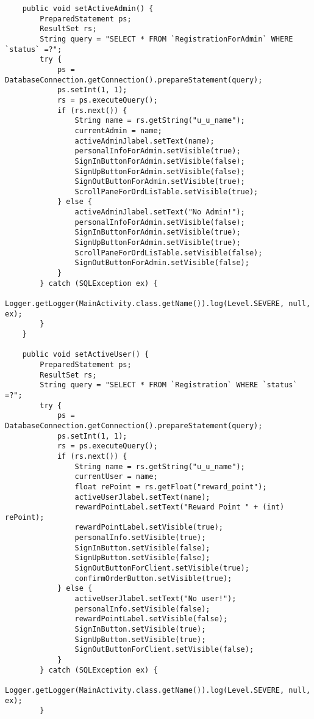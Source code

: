 \documentclass[12pt,a4paper]{article}
\begin{document}
\begin{lstlisting}
    public void setActiveAdmin() {
        PreparedStatement ps;
        ResultSet rs;
        String query = "SELECT * FROM `RegistrationForAdmin` WHERE `status` =?";
        try {
            ps = DatabaseConnection.getConnection().prepareStatement(query);
            ps.setInt(1, 1);
            rs = ps.executeQuery();
            if (rs.next()) {
                String name = rs.getString("u_u_name");
                currentAdmin = name;
                activeAdminJlabel.setText(name);
                personalInfoForAdmin.setVisible(true);
                SignInButtonForAdmin.setVisible(false);
                SignUpButtonForAdmin.setVisible(false);
                SignOutButtonForAdmin.setVisible(true);
                ScrollPaneForOrdLisTable.setVisible(true);
            } else {
                activeAdminJlabel.setText("No Admin!");
                personalInfoForAdmin.setVisible(false);
                SignInButtonForAdmin.setVisible(true);
                SignUpButtonForAdmin.setVisible(true);
                ScrollPaneForOrdLisTable.setVisible(false);
                SignOutButtonForAdmin.setVisible(false);
            }
        } catch (SQLException ex) {
            Logger.getLogger(MainActivity.class.getName()).log(Level.SEVERE, null, ex);
        }
    }

    public void setActiveUser() {
        PreparedStatement ps;
        ResultSet rs;
        String query = "SELECT * FROM `Registration` WHERE `status` =?";
        try {
            ps = DatabaseConnection.getConnection().prepareStatement(query);
            ps.setInt(1, 1);
            rs = ps.executeQuery();
            if (rs.next()) {
                String name = rs.getString("u_u_name");
                currentUser = name;
                float rePoint = rs.getFloat("reward_point");
                activeUserJlabel.setText(name);
                rewardPointLabel.setText("Reward Point " + (int) rePoint);
                rewardPointLabel.setVisible(true);
                personalInfo.setVisible(true);
                SignInButton.setVisible(false);
                SignUpButton.setVisible(false);
                SignOutButtonForClient.setVisible(true);
                confirmOrderButton.setVisible(true);
            } else {
                activeUserJlabel.setText("No user!");
                personalInfo.setVisible(false);
                rewardPointLabel.setVisible(false);
                SignInButton.setVisible(true);
                SignUpButton.setVisible(true);
                SignOutButtonForClient.setVisible(false);
            }
        } catch (SQLException ex) {
            Logger.getLogger(MainActivity.class.getName()).log(Level.SEVERE, null, ex);
        }


\end{lstlisting}
\end{document}
